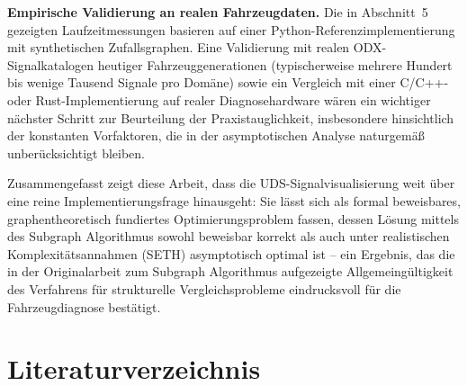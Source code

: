 ﻿\documentclass[a4paper,12pt]{article}
\theoremstyle{definition}
\begin{document}
\textbf{Empirische Validierung an realen Fahrzeugdaten.} Die in Abschnitt~5 gezeigten Laufzeitmessungen basieren auf einer Python-Referenzimplementierung mit synthetischen Zufallsgraphen. Eine Validierung mit realen ODX-Signalkatalogen heutiger Fahrzeuggenerationen (typischerweise mehrere Hundert bis wenige Tausend Signale pro Domäne) sowie ein Vergleich mit einer C/C++- oder Rust-Implementierung auf realer Diagnosehardware wären ein wichtiger nächster Schritt zur Beurteilung der Praxistauglichkeit, insbesondere hinsichtlich der konstanten Vorfaktoren, die in der asymptotischen Analyse naturgemäß unberücksichtigt bleiben.

Zusammengefasst zeigt diese Arbeit, dass die UDS-Signalvisualisierung weit über eine reine Implementierungsfrage hinausgeht: Sie lässt sich als formal beweisbares, graphentheoretisch fundiertes Optimierungsproblem fassen, dessen Lösung mittels des Subgraph Algorithmus sowohl beweisbar korrekt als auch unter realistischen Komplexitätsannahmen (SETH) asymptotisch optimal ist -- ein Ergebnis, das die in der Originalarbeit zum Subgraph Algorithmus aufgezeigte Allgemeingültigkeit des Verfahrens für strukturelle Vergleichsprobleme eindrucksvoll für die Fahrzeugdiagnose bestätigt.

\section*{Literaturverzeichnis}
\end{document}
